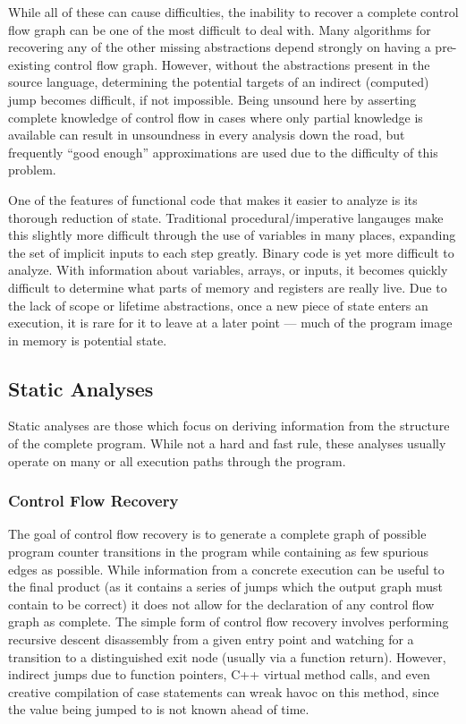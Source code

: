 While all of these can cause difficulties, the inability to recover a complete control flow graph can be one of the most difficult to deal with.
Many algorithms for recovering any of the other missing abstractions depend strongly on having a pre-existing control flow graph\cite{vsa,bddbddb,smash,tie,bitr,wrappedintervals,ramalingam2000}.
However, without the abstractions present in the source language, determining the potential targets of an indirect (computed) jump becomes difficult, if not impossible.
Being unsound here by asserting complete knowledge of control flow in cases where only partial knowledge is available can result in unsoundness in every analysis down the road, but frequently ``good enough'' approximations are used due to the difficulty of this problem.

One of the features of functional code that makes it easier to analyze is its thorough reduction of state.
Traditional procedural/imperative langauges make this slightly more difficult through the use of variables in many places, expanding the set of implicit inputs to each step greatly.
Binary code is yet more difficult to analyze.
With information about variables, arrays, or inputs, it becomes quickly difficult to determine what parts of memory and registers are really live.
Due to the lack of scope or lifetime abstractions, once a new piece of state enters an execution, it is rare for it to leave at a later point --- much of the program image in memory is potential state.

\subsection{Static Analyses}
Static analyses are those which focus on deriving information from the structure of the complete program.
While not a hard and fast rule, these analyses usually operate on many or all execution paths through the program.

\subsubsection{Control Flow Recovery}
\label{sec:cfg}
The goal of control flow recovery is to generate a complete graph of possible program counter transitions in the program while containing as few spurious edges as possible.
While information from a concrete execution can be useful to the final product (as it contains a series of jumps which the output graph must contain to be correct) it does not allow for the declaration of any control flow graph as complete.
The simple form of control flow recovery involves performing recursive descent disassembly from a given entry point and watching for a transition to a distinguished exit node (usually via a function return).
However, indirect jumps due to function pointers, C++ virtual method calls, and even creative compilation of case statements can wreak havoc on this method, since the value being jumped to is not known ahead of time.

